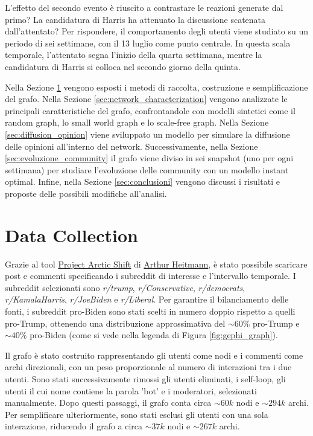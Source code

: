 \documentclass[sigchi]{acmart}
\begin{document}
L'effetto del secondo evento è riuscito a contrastare le reazioni generate dal primo? La candidatura di Harris ha attenuato la discussione scatenata dall'attentato? Per rispondere, il comportamento degli utenti viene studiato su un periodo di sei settimane, con il 13 luglio come punto centrale. In questa scala temporale, l'attentato segna l'inizio della quarta settimana, mentre la candidatura di Harris si colloca nel secondo giorno della quinta.

Nella Sezione \ref{sec:data_collection} vengono esposti i metodi di raccolta, costruzione e semplificazione del grafo. Nella Sezione \ref{sec:network_characterization} vengono analizzate le principali caratteristiche del grafo, confrontandole con modelli sintetici come il random graph, lo small world graph e lo scale-free graph. Nella Sezione \ref{sec:diffusion_opinion} viene sviluppato un modello per simulare la diffusione delle opinioni all'interno del network. Successivamente, nella Sezione \ref{sec:evoluzione_community} il grafo viene diviso in sei snapshot (uno per ogni settimana) per studiare l'evoluzione delle community con un modello instant optimal. Infine, nella Sezione \ref{sec:conclusioni} vengono discussi i risultati e proposte delle possibili modifiche all'analisi.

\section{Data Collection} \label{sec:data_collection}
Grazie al tool \href{https://arctic-shift.photon-reddit.com/download-tool}{Project Arctic Shift} di \href{https://github.com/ArthurHeitmann/arctic_shift.git}{Arthur Heitmann}, è stato possibile scaricare post e commenti specificando i subreddit di interesse e l'intervallo temporale. I subreddit selezionati sono \textit{r/trump}, \textit{r/Conservative}, \textit{r/democrats}, \textit{r/KamalaHarris}, \textit{r/JoeBiden} e \textit{r/Liberal}. Per garantire il bilanciamento delle fonti, i subreddit pro-Biden sono stati scelti in numero doppio rispetto a quelli pro-Trump, ottenendo una distribuzione approssimativa del $\sim60\%$ pro-Trump e $\sim40\%$ pro-Biden (come si vede nella legenda di Figura \ref{fig:gephi_graph}). 

Il grafo è stato costruito rappresentando gli utenti come nodi e i commenti come archi direzionali, con un peso proporzionale al numero di interazioni tra i due utenti. Sono stati successivamente rimossi gli utenti eliminati, i self-loop, gli utenti il cui nome contiene la parola 'bot' e i moderatori, selezionati manualmente. Dopo questi passaggi, il grafo conta circa $\sim 60k$ nodi e $\sim 294k$ archi. Per semplificare ulteriormente, sono stati esclusi gli utenti con una sola interazione, riducendo il grafo a circa $\sim 37k$ nodi e $\sim 267k$ archi.
\end{document}
